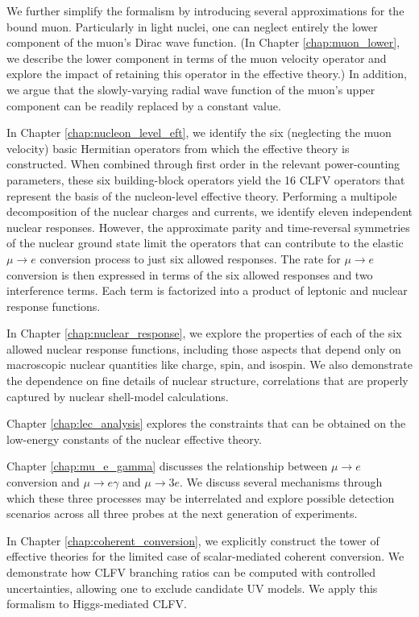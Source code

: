 \documentclass{book}[letterpaper,12pt]
\begin{document}
We further simplify the formalism by introducing several  approximations for the bound muon. Particularly in light nuclei, one can neglect entirely the lower component of the muon's Dirac wave function. (In Chapter \ref{chap:muon_lower}, we describe the lower component in terms of the muon velocity operator and explore the impact of retaining this operator in the effective theory.) In addition, we argue that the slowly-varying radial wave function of the muon's upper component can be readily replaced by a constant value.

In Chapter \ref{chap:nucleon_level_eft}, we identify the six (neglecting the muon velocity) basic Hermitian operators from which the effective theory is constructed. When combined through first order in the relevant power-counting parameters, these six building-block operators yield the 16 CLFV operators that represent the basis of the nucleon-level effective theory. Performing a multipole decomposition of the nuclear charges and currents, we identify eleven independent nuclear responses. However, the approximate parity and time-reversal symmetries of the nuclear ground state limit the operators that can contribute to the elastic $\mu\rightarrow e$ conversion process to just six allowed responses. The rate for $\mu\rightarrow e$ conversion is then expressed in terms of the six allowed responses and two interference terms. Each term is factorized into a product of leptonic and nuclear response functions.

In Chapter \ref{chap:nuclear_response}, we explore the properties of each of the six allowed nuclear response functions, including those aspects that depend only on macroscopic nuclear quantities like charge, spin, and isospin. We also demonstrate the dependence on fine details of nuclear structure, correlations that are properly captured by nuclear shell-model calculations. 

Chapter \ref{chap:lec_analysis} explores the constraints that can be obtained on the low-energy constants of the nuclear effective theory.

Chapter \ref{chap:mu_e_gamma} discusses the relationship between $\mu\rightarrow e$ conversion and $\mu\rightarrow e\gamma$ and $\mu\rightarrow 3e$. We discuss several mechanisms through which these three processes may be interrelated and explore possible detection scenarios across all three probes at the next generation of experiments.

In Chapter \ref{chap:coherent_conversion}, we explicitly construct the tower of effective theories for the limited case of scalar-mediated coherent conversion. We demonstrate how CLFV branching ratios can be computed with controlled uncertainties, allowing one to exclude candidate UV models. We apply this formalism to Higgs-mediated CLFV.
\end{document}
